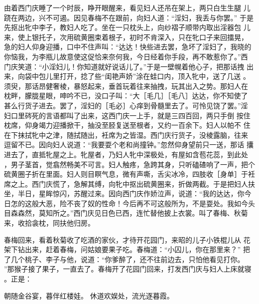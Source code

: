 由着西门庆睡了一个时辰，睁开眼醒来，看见妇人还吊在架上，两只白生生腿
儿跷在两边，兴不可遏。因见春梅不在跟前，向妇人道：“淫妇，我丢与你罢。”
于是先抠出牝中李子，教妇人吃了。坐在一只枕头上，向纱褶子顺带内取出淫器包
儿来，使上银托子，次用硫黄圈束着根子，初时不肯深入，只在牝口子来回擂晃，
急的妇人仰身迎播，口中不住声叫：“达达！快些进去罢，急坏了淫妇了，我晓的
你恼我，为李瓶儿故意使这促恰来奈何我，今日经着你手段，再不敢惹你了。”西
门庆笑道：“小淫妇儿！你知道就好说话儿了。”于是一壁幌着他心子，把那话拽
出来，向袋中包儿里打开，捻了些“闺艳声娇”涂在蛙口内，顶入牝中，送了几送
。须臾，那话昂健奢棱，暴怒起来，垂首玩着往来抽拽，玩其出入之势。那妇人在
枕畔，朦胧星眼，呻吟不已，没口子叫：“大［毛几］［毛八］达达，你不知使了
甚么行货子进去。罢了，淫妇的［毛必］心痒到骨髓里去了。可怜见饶了罢。”淫
妇口里硶死的言语都叫了出来，这西门庆一上手，就是三四百回，两只手倒
按住枕席，仰身竭力迎播掀干，抽没至胫复送至根者，又约一百余下。妇人以帕不
住在下抹拭牝中之津，随拭随出，衽席为之皆湿。西门庆行货子，没棱露脑，往来
逗留不已。因向妇人说道：“我要耍个老和尚撞钟。”忽然仰身望前只一送，那话
攮进去了，直抵牝屋之上。牝屋者，乃妇人牝中深极处，有屋如含苞花蕊，到此处
，男子茎首，觉翕然畅美不可言。妇人触疼，急跨其身，只听磕碴响了一声，把个
硫黄圈子折在里面。妇人则目瞑气息，微有声嘶，舌尖冰冷，四肢收［身单］于衽
席之上。西门庆慌了，急解其缚，向牝中抠出硫黄圈来，折做两截。于是把妇人扶
坐，半日，星眸惊闪，苏醒过来。因向西门庆作娇泣声，说道：“我的达达，你今
日怎的这般大恶，险不丧了奴的性命！今后再不可这般所为，不是耍处。我如今头
目森森然，莫知所之。”西门庆见日色已西，连忙替他披上衣裳。叫了春梅、秋菊
来，收拾衾枕，同扶他归房。

春梅回来，看着秋菊收了吃酒的家伙，才待开花园门，来昭的儿子小铁棍儿从
花架下钻出来，赶着春梅，问姑娘要果子吃。春梅道：“小囚儿，你在那里来？”
把了几个桃子、李子与他，说道：“你爹醉了，还不往前边去，只怕他看见打你。
”那猴子接了果子，一直去了。春梅开了花园门回来，打发西门庆与妇人上床就寝
。正是：

朝随金谷宴，暮伴红楼娃。
休道欢娱处，流光逐暮霞。